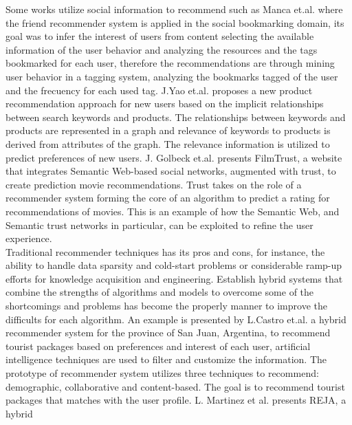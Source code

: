 Some works utilize social information to recommend such
as Manca et.al.\cite{manca2014mining} where the friend recommender
system is applied in the social bookmarking domain, its goal was to
infer the interest of users from content selecting the available
information of the user behavior and analyzing the resources and the
tags bookmarked for each user, therefore the recommendations are
through mining user behavior in a tagging system, analyzing the
bookmarks tagged of the user and the frecuency for each used tag. 
J.Yao et.al.\cite{yao2012product} proposes a new product recommendation
approach for new users based on the implicit relationships between
search keywords and products. The relationships between keywords and
products are represented in a graph and relevance of keywords to
products is derived from attributes of the graph.
The relevance
information is utilized to predict preferences of new users. J.
Golbeck et.al.\cite{golbeck2006filmtrust} presents FilmTrust, a
website that integrates Semantic Web-based social networks, augmented
with trust, to create prediction movie recommendations. Trust takes on
the role of a recommender system forming the core of an algorithm to
predict a rating for recommendations of movies. This is an example of
how the Semantic Web, and Semantic trust networks in particular, can
be exploited to refine the user experience. \\  
Traditional recommender techniques has its pros and cons, for
instance, the ability to handle data sparsity and cold-start problems
or considerable ramp-up efforts for knowledge acquisition and
engineering. Establish hybrid systems that combine the strengths of
algorithms and models to overcome some of the shortcomings and
problems has become the properly manner to improve the difficults for
each algorithm.
An example is presented by L.Castro et.al.\cite{castro2012prototype} 
a hybrid recommender system for the province of San Juan, Argentina, 
to recommend tourist packages  based on preferences and interest 
of each user, artificial intelligence
techniques are used to filter and customize the information. The
prototype of recommender system utilizes three techniques to
recommend: demographic, collaborative and content-based. The goal is
to recommend tourist packages that matches with the user profile.
L. Martinez et al.\cite{martinez2009reja} presents REJA, a hybrid
